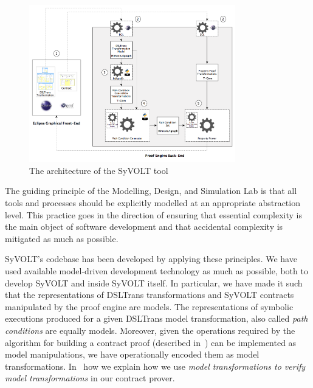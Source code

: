 \begin{figure}
\centering
\includegraphics[width=0.8\textwidth]{figures/syvolt_arch}
\caption{The architecture of the SyVOLT tool}
\label{fig:arch}
\end{figure}

The guiding principle of the Modelling, Design, and Simulation Lab is that all
tools and processes should be explicitly modelled at an appropriate abstraction level.
This practice goes in the direction of ensuring that essential
complexity is the main object of software development and that accidental
complexity is mitigated as much as possible.

SyVOLT's codebase has been developed by applying these principles. We have used
available model-driven development technology as much as possible, both to
develop SyVOLT and inside SyVOLT itself. In particular, we have made it such
that the representations of DSLTrans transformations and SyVOLT contracts
manipulated by the proof engine are models. The representations of symbolic
executions produced for a given DSLTrans model transformation, also called
\emph{path conditions} are equally models. Moreover, given the operations
required by the algorithm for building a contract proof (described in~\cite{Lucio2014}) can be implemented as model
manipulations, we have operationally encoded them as model transformations.
In~\cite{LucioVang} how we explain how we use \emph{model transformations to
verify model transformations} in our contract prover.\\


